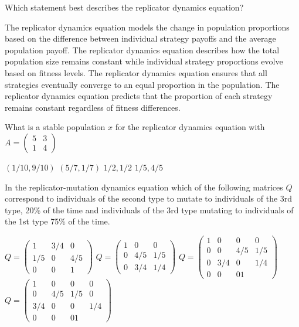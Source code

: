 \documentclass{exam}
\begin{document}
\begin{questions}
        
    \question
    Which statement best describes the replicator dynamics equation?

    \begin{checkboxes}
        \choice The replicator dynamics equation models the change in population proportions based on the difference between individual strategy payoffs and the average population payoff.
            \choice The replicator dynamics equation describes how the total population size remains constant while individual strategy proportions evolve based on fitness levels.
            \choice The replicator dynamics equation ensures that all strategies eventually converge to an equal proportion in the population.
            \choice The replicator dynamics equation predicts that the proportion of each strategy remains constant regardless of fitness differences.
    \end{checkboxes}

    \question What is a stable population \(x\) for the replicator dynamics
    equation with \(A=\begin{pmatrix}5 & 3\\ 1 & 4\end{pmatrix}\)

    \begin{checkboxes}
        \choice \((1/10, 9/10)\)
        \choice \((5/7, 1/7)\)
        \choice \(1/2, 1/2\)
        \choice \(1/5, 4/5\)
    \end{checkboxes}

    \question In the replicator-mutation dynamics equation which of the
    following matrices \(Q\) correspond to individuals of the second type to
    mutate to individuals of the 3rd type, 20\% of the time and individuals of
    the 3rd type mutating to individuals of the 1st type 75\% of the time.
    \begin{checkboxes}
        \choice
    \(
        Q = \begin{pmatrix}1 & 3/4 & 0 \\1/5 & 0 & 4 /5\\0 & 0 & 1\end{pmatrix}
    \)
        \choice
    \(
        Q = \begin{pmatrix}1 & 0 & 0\\0 & 4/5 & 1/5\\ 0 & 3/4 & 1/4 \end{pmatrix}
    \)
        \choice
    \(
        Q = \begin{pmatrix}1 & 0 & 0 & 0\\0 & 0 & 4/5 & 1/5\\ 0 & 3/4 & 0 & 1/4
        \\ 0 & 0 & 0 1\end{pmatrix}
    \)
        \choice
    \(
        Q = \begin{pmatrix}1 & 0 & 0 & 0\\0 & 4/5 & 1/5 & 0\\ 3/4 & 0 & 0 & 1/4
        \\ 0 & 0 & 0 1\end{pmatrix}
    \)
\end{checkboxes}

\end{questions}
\end{document}
